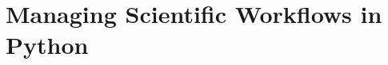 \documentclass[pdf,ps2pdf,12pt,report,OUO]{SANDreport}
\begin{document}


    \SANDmain		%


    \chapter{Managing Scientific Workflows in Python}

    
    
    



    \clearpage
    \providecommand*{\phantomsection}{}
    \phantomsection
    
    


\end{document}
